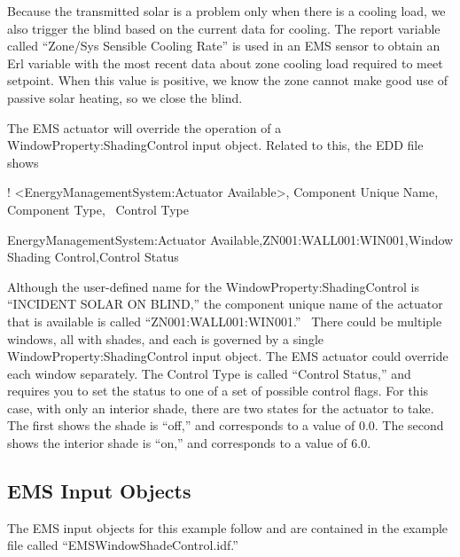 Because the transmitted solar is a problem only when there is a cooling load, we also trigger the blind based on the current data for cooling. The report variable called ``Zone/Sys Sensible Cooling Rate'' is used in an EMS sensor to obtain an Erl variable with the most recent data about zone cooling load required to meet setpoint. When this value is positive, we know the zone cannot make good use of passive solar heating, so we close the blind.

The EMS actuator will override the operation of a WindowProperty:ShadingControl input object. Related to this, the EDD file shows

! \textless{}EnergyManagementSystem:Actuator Available\textgreater{}, Component Unique Name, Component Type,~ Control Type

EnergyManagementSystem:Actuator Available,ZN001:WALL001:WIN001,Window Shading Control,Control Status

Although the user-defined name for the WindowProperty:ShadingControl is ``INCIDENT SOLAR ON BLIND,'' the component unique name of the actuator that is available is called ``ZN001:WALL001:WIN001.''~ There could be multiple windows, all with shades, and each is governed by a single WindowProperty:ShadingControl input object. The EMS actuator could override each window separately. The Control Type is called ``Control Status,'' and requires you to set the status to one of a set of possible control flags. For this case, with only an interior shade, there are two states for the actuator to take. The first shows the shade is ``off,'' and corresponds to a value of 0.0. The second shows the interior shade is ``on,'' and corresponds to a value of 6.0.

\subsection{EMS Input Objects}\label{ems-input-objects-008}

The EMS input objects for this example follow and are contained in the example file called ``EMSWindowShadeControl.idf.''

